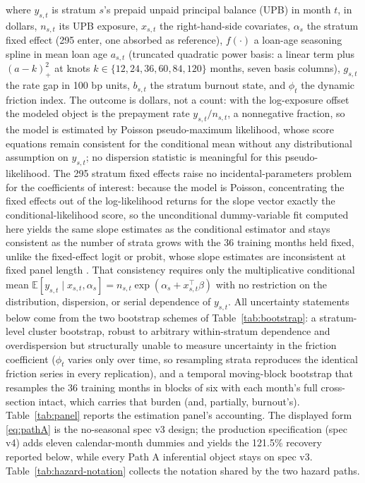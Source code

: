 \documentclass[12pt]{article}
\begin{document}
where $y_{s,t}$ is stratum $s$'s prepaid unpaid principal balance (UPB) in month $t$, in dollars, $n_{s,t}$ its UPB exposure, $x_{s,t}$ the right-hand-side covariates, $\alpha_{s}$ the stratum fixed effect (295 enter, one absorbed as reference), $f(\cdot)$ a loan-age seasoning spline in mean loan age $a_{s,t}$ (truncated quadratic power basis: a linear term plus $(a - k)_+^2$ at knots $k \in \{12, 24, 36, 60, 84, 120\}$ months, seven basis columns), $g_{s,t}$ the rate gap in 100 bp units, $b_{s,t}$ the stratum burnout state, and $\phi_t$ the dynamic friction index. The outcome is dollars, not a count: with the log-exposure offset the modeled object is the prepayment rate $y_{s,t}/n_{s,t}$, a nonnegative fraction, so the model is estimated by Poisson pseudo-maximum likelihood, whose score equations remain consistent for the conditional mean without any distributional assumption on $y_{s,t}$; no dispersion statistic is meaningful for this pseudo-likelihood. The 295 stratum fixed effects raise no incidental-parameters problem for the coefficients of interest: because the model is Poisson, concentrating the fixed effects out of the log-likelihood returns for the slope vector exactly the conditional-likelihood score, so the unconditional dummy-variable fit computed here yields the same slope estimates as the conditional estimator and stays consistent as the number of strata grows with the 36 training months held fixed, unlike the fixed-effect logit or probit, whose slope estimates are inconsistent at fixed panel length \citep{wooldridge1999}. That consistency requires only the multiplicative conditional mean $\mathbb{E}[y_{s,t}\mid x_{s,t},\alpha_{s}] = n_{s,t}\exp(\alpha_{s} + x_{s,t}^{\top}\beta)$ with no restriction on the distribution, dispersion, or serial dependence of $y_{s,t}$. All uncertainty statements below come from the two bootstrap schemes of Table~\ref{tab:bootstrap}: a stratum-level cluster bootstrap, robust to arbitrary within-stratum dependence and overdispersion but structurally unable to measure uncertainty in the friction coefficient ($\phi_t$ varies only over time, so resampling strata reproduces the identical friction series in every replication), and a temporal moving-block bootstrap that resamples the 36 training months in blocks of six with each month's full cross-section intact, which carries that burden (and, partially, burnout's). Table~\ref{tab:panel} reports the estimation panel's accounting. The displayed form \eqref{eq:pathA} is the no-seasonal spec v3 design; the production specification (spec v4) adds eleven calendar-month dummies and yields the 121.5\% recovery reported below, while every Path A inferential object stays on spec v3. Table~\ref{tab:hazard-notation} collects the notation shared by the two hazard paths.
\end{document}
